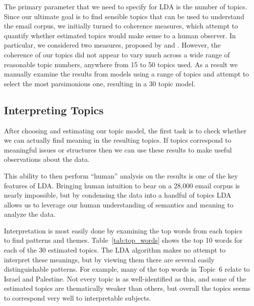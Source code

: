 \documentclass[12pt]{article}
\theoremstyle{definition}
\theoremstyle{algodesc}
\begin{document}
The primary parameter that we need to specify for LDA is the number of topics. Since our ultimate goal is to find sensible topics that can be used to understand the email corpus, we initially turned to coherence measures, which attempt to quantify whether estimated topics would make sense to a human observer. In particular, we considered two measures, proposed by \citet{mimnoetal11} and \citet{newmanetal11}. However, the coherence of our topics did not appear to vary much across a wide range of reasonable topic numbers, anywhere from 15 to 50 topics used. As a result we manually examine the results from models using a range of topics and attempt to select the most parsimonious one, resulting in a 30 topic model.



\subsection{Interpreting Topics}
After choosing and estimating our topic model, the first task is to check whether we can actually find meaning in the resulting topics. If topics correspond to meaningful issues or structures then we can use these results to make useful observations about the data.

This ability to then perform ``human'' analysis on the results is one of the key features of LDA. Bringing human intuition to bear on a 28,000 email corpus is nearly impossible, but by condensing the data into a handful of topics LDA allows us to leverage our human understanding of semantics and meaning to analyze the data.

Interpretation is most easily done by examining the top words from each topics to find patterns and themes. Table~\ref{tab:top_words} shows the top 10 words for each of the 30 estimated topics. The LDA algorithm makes no attempt to interpret these meanings, but by viewing them there are several easily distinguishable patterns. For example, many of the top words in Topic~6 relate to Israel and Palestine. Not every topic is as well-identified as this, and some of the estimated topics are thematically weaker than others, but overall the topics seems to correspond very well to interpretable subjects.
\end{document}
